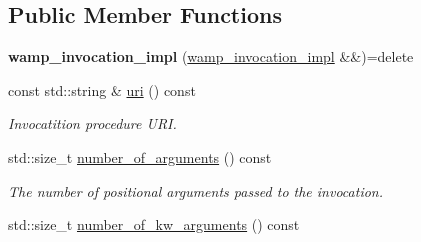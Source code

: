 \subsection*{Public Member Functions}
\begin{DoxyCompactItemize}
\item 
{\bfseries wamp\+\_\+invocation\+\_\+impl} (\hyperlink{classautobahn_1_1wamp__invocation__impl}{wamp\+\_\+invocation\+\_\+impl} \&\&)=delete\hypertarget{classautobahn_1_1wamp__invocation__impl_a5fa87a57f71e2725afb125ed7fb06c6f}{}\label{classautobahn_1_1wamp__invocation__impl_a5fa87a57f71e2725afb125ed7fb06c6f}

\item 
const std\+::string \& \hyperlink{classautobahn_1_1wamp__invocation__impl_af54d8b7be876ae06318e8af927674c4a}{uri} () const 
\begin{DoxyCompactList}\small\item\em Invocatition procedure U\+RI. \end{DoxyCompactList}\item 
std\+::size\+\_\+t \hyperlink{classautobahn_1_1wamp__invocation__impl_a7dd33c1ecf3673a47b424084881e2655}{number\+\_\+of\+\_\+arguments} () const \hypertarget{classautobahn_1_1wamp__invocation__impl_a7dd33c1ecf3673a47b424084881e2655}{}\label{classautobahn_1_1wamp__invocation__impl_a7dd33c1ecf3673a47b424084881e2655}

\begin{DoxyCompactList}\small\item\em The number of positional arguments passed to the invocation. \end{DoxyCompactList}\item 
std\+::size\+\_\+t \hyperlink{classautobahn_1_1wamp__invocation__impl_a98269e41093cd90115119cebe3d6b630}{number\+\_\+of\+\_\+kw\+\_\+arguments} () const \hypertarget{classautobahn_1_1wamp__invocation__impl_a98269e41093cd90115119cebe3d6b630}{}\label{classautobahn_1_1wamp__invocation__impl_a98269e41093cd90115119cebe3d6b630}


\end{DoxyCompactItemize}
